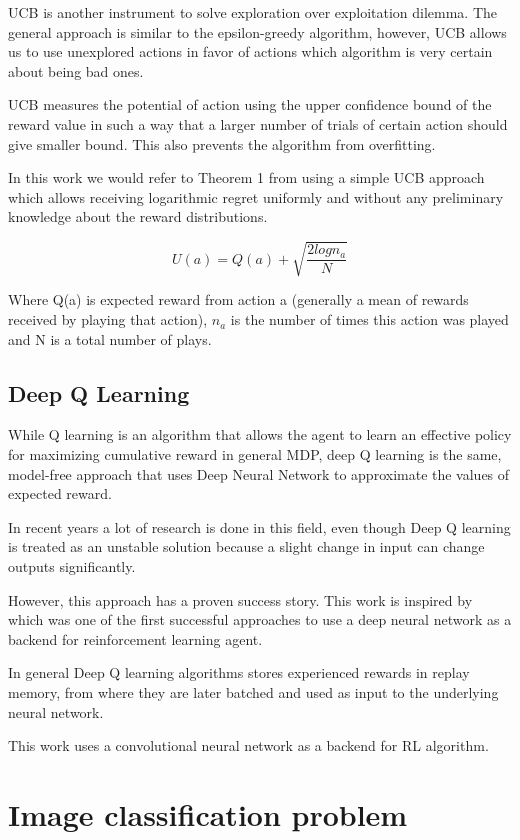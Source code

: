 UCB is another instrument to solve exploration over exploitation dilemma. The general approach is similar to the epsilon-greedy algorithm, however, UCB allows us to use unexplored actions in favor of actions which algorithm is very certain about being bad ones.

UCB measures the potential of action using the upper confidence bound of the reward value in such a way that a larger number of trials of certain action should give smaller bound. This also prevents the algorithm from overfitting.

In this work we would refer to Theorem 1 from \cite{Auer2002} using a simple UCB approach which allows receiving logarithmic regret uniformly and without any preliminary knowledge about the reward distributions.

\[
U(a) = Q(a) + \sqrt{\frac{2 log n_a}{N}}
\]

Where Q(a) is expected reward from action a (generally a mean of rewards received by playing that action), $n_a$ is the number of times this action was played and N is a total number of plays.
\subsection{Deep Q Learning}
While Q learning is an algorithm that allows the agent to learn an effective policy for maximizing cumulative reward in general MDP, deep Q learning is the same, model-free approach that uses Deep Neural Network to approximate the values of expected reward.

In recent years a lot of research is done in this field, even though Deep Q learning is treated as an unstable solution because a slight change in input can change outputs significantly.

However, this approach has a proven success story. This work is inspired by \cite{MnihKSGAWR13} which was one of the first successful approaches to use a deep neural network as a backend for reinforcement learning agent.

In general Deep Q learning algorithms stores experienced rewards in replay memory, from where they are later batched and used as input to the underlying neural network.

This work uses a convolutional neural network as a backend for RL algorithm.
\section{Image classification problem}

